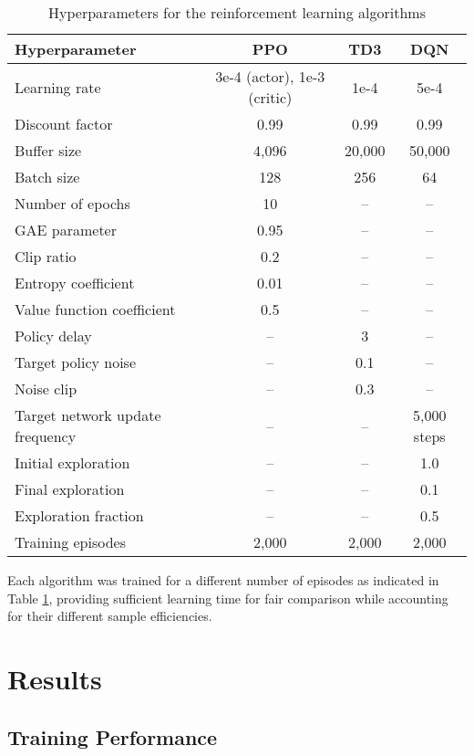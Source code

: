 \documentclass[12pt]{article}
\begin{document}
\begin{table}[H]
\centering
\caption{Hyperparameters for the reinforcement learning algorithms}
\label{tab:hyperparameters}
\begin{tabular}{lccc}
\toprule
\textbf{Hyperparameter} & \textbf{PPO} & \textbf{TD3} & \textbf{DQN} \\
\midrule
Learning rate & 3e-4 (actor), 1e-3 (critic) & 1e-4 & 5e-4 \\
Discount factor & 0.99 & 0.99 & 0.99 \\
Buffer size & 4,096 & 20,000 & 50,000 \\
Batch size & 128 & 256 & 64 \\
Number of epochs & 10 & -- & -- \\
GAE parameter & 0.95 & -- & -- \\
Clip ratio & 0.2 & -- & -- \\
Entropy coefficient & 0.01 & -- & -- \\
Value function coefficient & 0.5 & -- & -- \\
Policy delay & -- & 3 & -- \\
Target policy noise & -- & 0.1 & -- \\
Noise clip & -- & 0.3 & -- \\
Target network update frequency & -- & -- & 5,000 steps \\
Initial exploration & -- & -- & 1.0 \\
Final exploration & -- & -- & 0.1 \\
Exploration fraction & -- & -- & 0.5 \\
Training episodes & 2,000 & 2,000 & 2,000 \\
\bottomrule
\end{tabular}
\end{table}

Each algorithm was trained for a different number of episodes as indicated in Table \ref{tab:hyperparameters}, providing sufficient learning time for fair comparison while accounting for their different sample efficiencies.

\section{Results}
\subsection{Training Performance}
\end{document}
